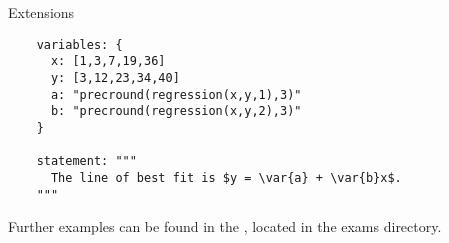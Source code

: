 \begin{chapter}{\label{cha:extensions}Extensions}
  \begin{Verbatim}
    variables: {
      x: [1,3,7,19,36]
      y: [3,12,23,34,40]
      a: "precround(regression(x,y,1),3)"
      b: "precround(regression(x,y,2),3)"
    }
    
    statement: """
      The line of best fit is $y = \var{a} + \var{b}x$.
    """  
	\end{Verbatim}
	
	Further examples can be found in the , located in the exams directory.
		
\end{chapter}
